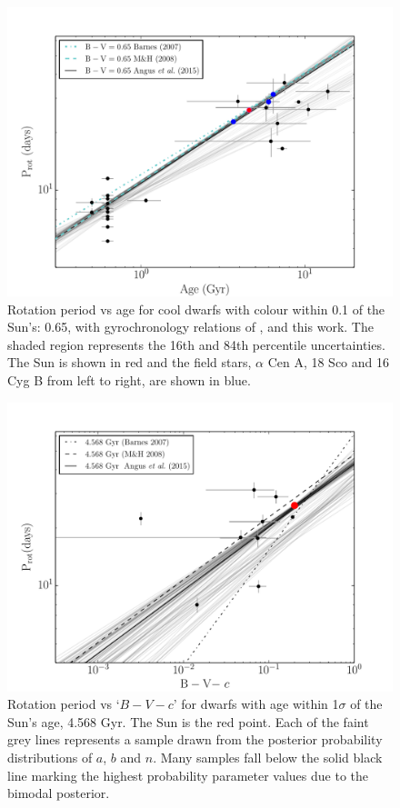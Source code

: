 \documentclass[useAMS, usenatbib]{mn2e}
\begin{document}
\begin{figure}
\begin{center}
\includegraphics[width=6in, clip=true, trim=0 0 0.5in 0]{p_vs_a_solar.pdf}
\caption{Rotation period vs age for cool dwarfs with colour within 0.1 of the
	Sun's: 0.65, with gyrochronology relations of \citet{Barnes2007},
	\citet{Mamajek2008} and this work. The shaded region represents the
	16th and 84th percentile uncertainties. The Sun is shown in red and the
	field stars, $\alpha$ Cen A, 18 Sco and 16 Cyg B from left to right,
	are shown in blue.
\label{fig:p_vs_a_solar}}
\end{center}
\end{figure}

\begin{figure}
\begin{center}
\includegraphics[width=6in, clip=true, trim=0 0 0.5in 0]{p_vs_bv_solar.pdf}
\caption{Rotation period vs `$B-V-c$' for dwarfs with age within 1$\sigma$ of
	the Sun's age, 4.568 Gyr.
	The Sun is the red point.
	Each of the faint grey lines represents a
	sample drawn from the posterior probability distributions of $a$, $b$ and $n$.
	Many samples fall below the solid black line marking the highest
	probability parameter values due to the bimodal posterior.
\label{fig:p_vs_bv_solar}}
\end{center}
\end{figure}
\end{document}
